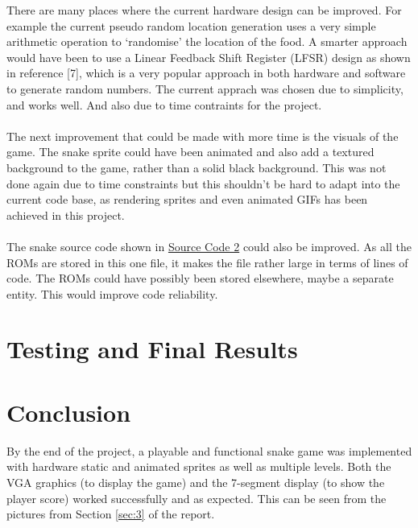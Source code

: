 \documentclass[aps, secnumarabic, balancelastpage, asmath, amssymb, nofootinbib, floatfix,]{revtex4-2}
\begin{document}
{There are many places where the current hardware design can be improved. For example the current pseudo random location generation uses a very simple arithmetic operation to `randomise' the location of the food. A smarter approach would have been to use a Linear Feedback Shift Register (LFSR) design as shown in reference [7], which is a very popular approach in both hardware and software to generate random numbers. The current apprach was chosen due to simplicity, and works well. And also due to time contraints for the project. ~\\
~\\
The next improvement that could be made with more time is the visuals of the game. The snake sprite could have been animated and also add a textured background to the game, rather than a solid black background. This was not done again due to time constraints but this shouldn't be hard to adapt into the current code base, as rendering sprites and even animated GIFs has been achieved in this project. ~\\
~\\
The snake source code shown in \hyperref[code:snake]{Source Code 2} could also be improved. As all the ROMs are stored in this one file, it makes the file rather large in terms of lines of code. The ROMs could have possibly been stored elsewhere, maybe a separate entity. This would improve code reliability.

\clearpage


\section{\fontsize{11.3pt}{12pt}\selectfont \bf Testing and Final Results}
\fontsize{11pt}{12pt}\selectfont \label{sec:3}








\clearpage






\section{\fontsize{11.3pt}{12pt}\selectfont \bf Conclusion}
\fontsize{11pt}{12pt}\selectfont \label{sec:4}


By the end of the project, a playable and functional snake game was implemented with hardware static and animated sprites as well as multiple levels. Both the VGA graphics (to display the game) and the 7-segment display (to show the player score) worked successfully and as expected. This can be seen from the pictures from Section \ref{sec:3} of the report.~\\

}
\end{document}

